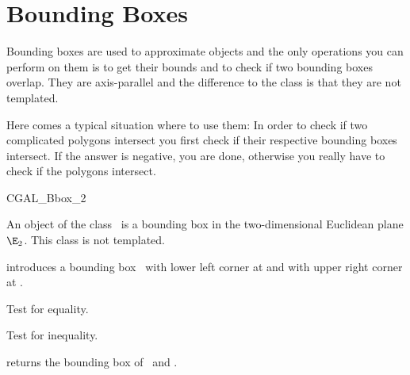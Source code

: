 
\cleardoublepage
\chapter{Bounding Boxes} \label{Bbox}


Bounding boxes are used to approximate objects and the only operations 
you can perform on them is to get their bounds and to check if two
bounding boxes overlap. They are axis-parallel and the difference to 
the class  is that they are not templated.

Here comes a typical situation where to use them: In order to check
if two complicated polygons intersect you first check if their 
respective bounding boxes intersect. If the answer is negative,
you are done, otherwise you really have to check if the polygons 
intersect.
 
\begin{class} {CGAL_Bbox_2}

  An object  of the class \classname\ is a bounding 
box in the two-dimensional Euclidean plane $\E_2$. This class is not templated.


\creation
{}


            {introduces a bounding box \var\ with lower left corner at 
              and with upper right corner at 
             .}


\operations
\threecolumns{5cm}{4cm}

       {Test for equality.}

       {Test for inequality.}

       {}
       {}
       {}
       {}

       {returns the bounding box of \var\ and .}

       {}
\end{class} 

%
%
%
